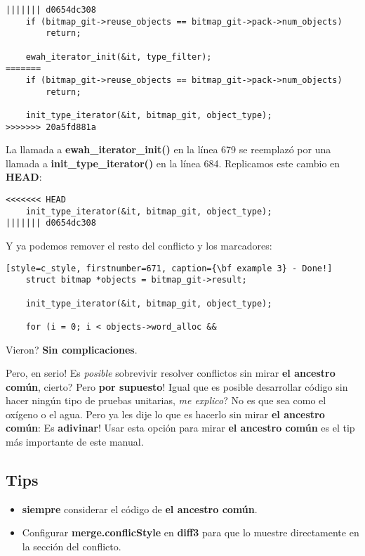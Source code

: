 \begin{lstlisting}[style=c_style, firstnumber=675, caption={\bf Ejemplo 3} - Paso 2]
||||||| d0654dc308
	if (bitmap_git->reuse_objects == bitmap_git->pack->num_objects)
		return;

	ewah_iterator_init(&it, type_filter);
=======
	if (bitmap_git->reuse_objects == bitmap_git->pack->num_objects)
		return;

	init_type_iterator(&it, bitmap_git, object_type);
>>>>>>> 20a5fd881a
\end{lstlisting}

La llamada a {\bf ewah\_iterator\_init()} en la línea 679 se reemplazó por una llamada a {\bf init\_type\_iterator()} en la línea
684. Replicamos este cambio en {\bf HEAD}:

\begin{lstlisting}[style=c_style, firstnumber=673, caption={\bf Ejemplo 3} - Paso 3]
<<<<<<< HEAD
	init_type_iterator(&it, bitmap_git, object_type);
||||||| d0654dc308
\end{lstlisting}

Y ya podemos remover el resto del conflicto y los marcadores:

\begin{lstlisting}[style=c_style, firstnumber=671, caption={\bf example 3} - Done!]
	struct bitmap *objects = bitmap_git->result;

	init_type_iterator(&it, bitmap_git, object_type);

	for (i = 0; i < objects->word_alloc &&
\end{lstlisting}

Vieron? {\bf Sin complicaciones}.

Pero, en serio! Es {\it posible} sobrevivir resolver conflictos sin mirar {\bf el ancestro común}, cierto?
Pero {\bf por supuesto}! Igual que es posible desarrollar código sin hacer ningún tipo de pruebas unitarias, {\it me
explico}? No es que sea como el oxígeno o el agua. Pero ya les dije lo que es hacerlo sin mirar {\bf el ancestro común}:
Es {\bf adivinar}! Usar esta opción para mirar {\bf el ancestro común} es el tip más importante de este manual.

\subsection{Tips}
\begin{itemize}
	\item {\bf siempre} considerar el código de {\bf el ancestro común}.
	\item Configurar {\bf merge.conflicStyle} en {\bf diff3} para que lo muestre directamente en la sección del conflicto.
\end{itemize}


